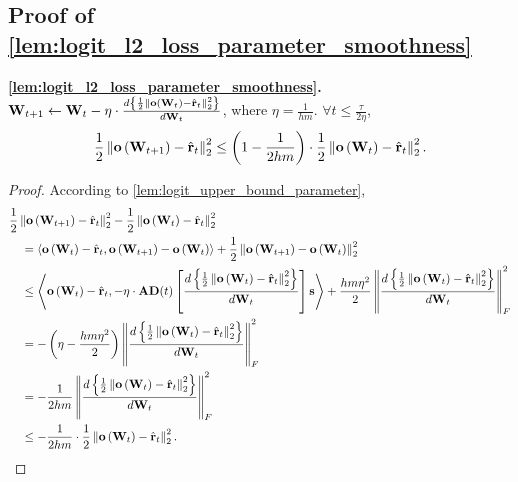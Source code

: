 \subsection{Proof of \cref{lem:logit_l2_loss_parameter_smoothness}}

{\bf \cref{lem:logit_l2_loss_parameter_smoothness}.} ${\mathbf{W}}_{t+1} \leftarrow {\mathbf{W}}_t - \eta \cdot \frac{d \left\{ \frac{1}{2} \left\| {\mathbf{o}}\left( {\mathbf{W}}_t\right) - \hat{{\mathbf{r}}}_t \right\|_2^2 \right\}}{d {\mathbf{W}}_t}$, where $\eta = \frac{1}{h m}$. $\forall t \le \frac{\tau}{2 \eta}$,
\begin{equation*}
\begin{split}
    \frac{1}{2} \left\| {\mathbf{o}}\left( {\mathbf{W}}_{t+1} \right) - \hat{{\mathbf{r}}}_t \right\|_2^2 \le \left( 1 - \frac{1}{2 h m} \right) \cdot \frac{1}{2} \left\| {\mathbf{o}}\left( {\mathbf{W}}_t \right) - \hat{{\mathbf{r}}}_t \right\|_2^2.
\end{split}
\end{equation*}
\begin{proof}
According to \cref{lem:logit_upper_bound_parameter},
\begin{equation*}
\begin{split}
    &\frac{1}{2} \left\| {\mathbf{o}}\left( {\mathbf{W}}_{t+1} \right) - \hat{{\mathbf{r}}}_t \right\|_2^2 - \frac{1}{2} \left\| {\mathbf{o}}\left( {\mathbf{W}}_t \right) - \hat{{\mathbf{r}}}_t \right\|_2^2 \\
    &\quad = \left\langle {\mathbf{o}}\left( {\mathbf{W}}_t \right) - \hat{{\mathbf{r}}}_t, {\mathbf{o}}\left( {\mathbf{W}}_{t+1} \right) - {\mathbf{o}}\left( {\mathbf{W}}_t \right) \right\rangle + \frac{1}{2} \left\| {\mathbf{o}}\left( {\mathbf{W}}_{t+1} \right) - {\mathbf{o}}\left( {\mathbf{W}}_t \right) \right\|_2^2 \\
    &\quad \le \left\langle {\mathbf{o}}\left( {\mathbf{W}}_t \right) - \hat{{\mathbf{r}}}_t, - \eta \cdot {\mathbf{A}} {\mathbf{D}}(t) \left[ \frac{d \left\{ \frac{1}{2} \left\| {\mathbf{o}}\left( {\mathbf{W}}_t\right) - \hat{{\mathbf{r}}}_t \right\|_2^2 \right\}}{d {\mathbf{W}}_t} \right] {\mathbf{s}} \right\rangle + \frac{h m \eta^2}{2} \left\| \frac{d \left\{ \frac{1}{2} \left\| {\mathbf{o}}\left( {\mathbf{W}}_t\right) - \hat{{\mathbf{r}}}_t \right\|_2^2 \right\}}{d {\mathbf{W}}_t}  \right\|_F^2 \\
    &\quad = - \left( \eta - \frac{h m \eta^2}{2} \right) \left\| \frac{d \left\{ \frac{1}{2} \left\| {\mathbf{o}}\left( {\mathbf{W}}_t\right) - \hat{{\mathbf{r}}}_t \right\|_2^2 \right\}}{d {\mathbf{W}}_t}  \right\|_F^2 \\
    &\quad = - \frac{1}{2 h m} \left\| \frac{d \left\{ \frac{1}{2} \left\| {\mathbf{o}}\left( {\mathbf{W}}_t\right) - \hat{{\mathbf{r}}}_t \right\|_2^2 \right\}}{d {\mathbf{W}}_t}  \right\|_F^2 \\
    &\quad \le - \frac{1}{2 h m} \cdot \frac{1}{2} \left\| {\mathbf{o}}\left( {\mathbf{W}}_t\right) - \hat{{\mathbf{r}}}_t \right\|_2^2. \qedhere
\end{split}
\end{equation*}
\end{proof}

